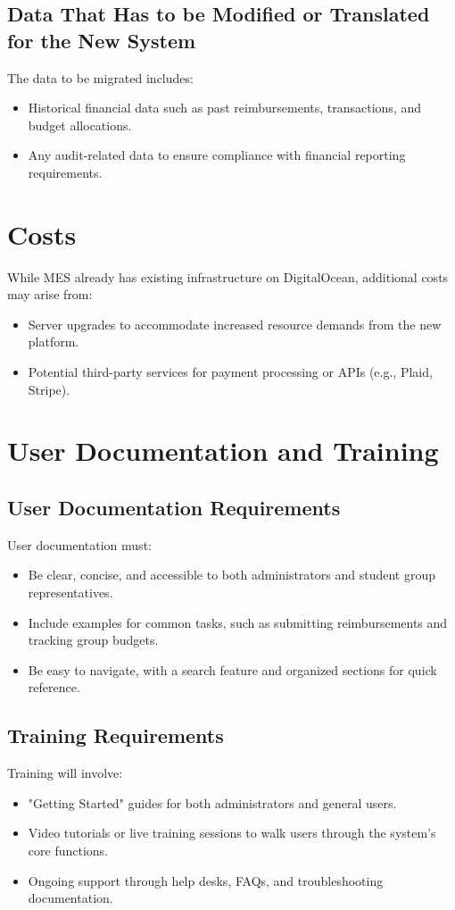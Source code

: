 \documentclass[12pt]{article}
\begin{document}
\subsection{Data That Has to be Modified or Translated for the New System}
The data to be migrated includes:
\begin{itemize}
    \item Historical financial data such as past reimbursements, transactions, and budget allocations.
    \item Any audit-related data to ensure compliance with financial reporting requirements.
\end{itemize}

\section{Costs}
While MES already has existing infrastructure on DigitalOcean, additional costs may arise from:
\begin{itemize}
    \item Server upgrades to accommodate increased resource demands from the new platform.
    \item Potential third-party services for payment processing or APIs (e.g., Plaid, Stripe).
\end{itemize}


\section{User Documentation and Training}

\subsection{User Documentation Requirements}
User documentation must:
\begin{itemize}
    \item Be clear, concise, and accessible to both administrators and student group representatives.
    \item Include examples for common tasks, such as submitting reimbursements and tracking group budgets.
    \item Be easy to navigate, with a search feature and organized sections for quick reference.
\end{itemize}

\subsection{Training Requirements}
Training will involve:
\begin{itemize}
    \item "Getting Started" guides for both administrators and general users.
    \item Video tutorials or live training sessions to walk users through the system’s core functions.
    \item Ongoing support through help desks, FAQs, and troubleshooting documentation.
\end{itemize}
\end{document}
